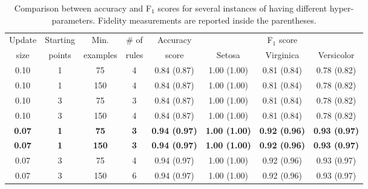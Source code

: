 
\begin{table}
	\caption{Comparison between accuracy and F$_1$ scores for several instances of \iter{} having different hyper-parameters. Fidelity measurements are reported inside the parentheses.}
	\label{tab:iter}
	\begin{tabular}{c|c|c|c|c|ccc}
		\toprule
		Update & Starting & Min. & \# of & Accuracy & \multicolumn{3}{c}{F$_1$ score}\\
 		size & points & examples & rules & score & Setosa & Virginica & Versicolor \\
		\midrule
		0.10 & 1 & 75 & 4 & 0.84 (0.87) & 1.00 (1.00) & 0.81 (0.84) & 0.78 (0.82) \\
		0.10 & 1 & 150 & 4 & 0.84 (0.87) & 1.00 (1.00) & 0.81 (0.84) & 0.78 (0.82) \\
		0.10 & 3 & 75 & 3 & 0.84 (0.87) & 1.00 (1.00) & 0.81 (0.84) & 0.78 (0.82) \\
		0.10 & 3 & 150 & 4 & 0.84 (0.87) & 1.00 (1.00) & 0.81 (0.84) & 0.78 (0.82) \\
		\textbf{0.07} & \textbf{1} & \textbf{75} & \textbf{3} & \textbf{0.94 (0.97)} & \textbf{1.00 (1.00)} & \textbf{0.92 (0.96)} & \textbf{0.93 (0.97)} \\
		\textbf{0.07} & \textbf{1} & \textbf{150} & \textbf{3} & \textbf{0.94 (0.97)} & \textbf{1.00 (1.00)} & \textbf{0.92 (0.96)} & \textbf{0.93 (0.97)} \\
		0.07 & 3 & 75 & 4 & 0.94 (0.97) & 1.00 (1.00) & 0.92 (0.96) & 0.93 (0.97) \\
		0.07 & 3 & 150 & 6 & 0.94 (0.97) & 1.00 (1.00) & 0.92 (0.96) & 0.93 (0.97) \\
		\bottomrule
	\end{tabular}
\end{table}
